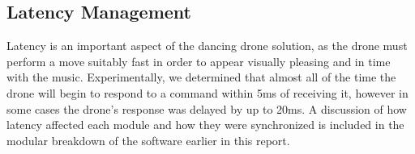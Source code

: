 \subsection{Latency Management}


Latency is an important aspect of the dancing drone solution, as the drone must perform a move suitably fast in
order to appear visually pleasing and in time with the music. Experimentally, we determined that almost all of
the time the drone will begin to respond to a command within 5ms of receiving it, however in some cases the
drone's response was delayed by up to 20ms. A discussion of how latency affected each module and how they were
synchronized is included in the modular breakdown of the software earlier in this report.
